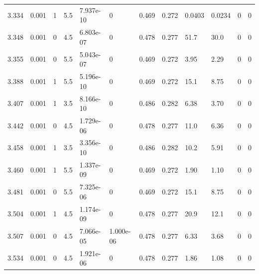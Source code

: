 \documentclass[preview]{standalone}
\begin{document}
{{{{{{\begin{tabular}{L{1.2cm}C{1.2cm} C{0.3cm}C{0.5cm} C{1.4cm}C{1.4cm} C{1.4cm}C{1.4cm} C{1.6cm}C{1.6cm} C{1.6cm}C{1.6cm}}
  3.334  &  0.001  & 1     & 5.5 &  7.937e-10  & 0  &  0.469&   0.272& 0.0403 & 0.0234   &  0 & 0  \\ 
  3.348  &  0.001  & 0     & 4.5 &  6.803e-07  & 0  &  0.478&   0.277& 51.7 & 30.0   &  0 & 0  \\ 
  3.355  &  0.001  & 0     & 5.5 &  5.043e-07  & 0  &  0.469&   0.272& 3.95 & 2.29   &  0 & 0  \\ 
  3.388  &  0.001  & 1     & 5.5 &  5.196e-10  & 0  &  0.469&   0.272& 15.1 & 8.75   &  0 & 0  \\ 
  3.407  &  0.001  & 1     & 3.5 &  8.166e-10  & 0  &  0.486&   0.282& 6.38 & 3.70   &  0 & 0  \\ 
  3.442  &  0.001  & 0     & 4.5 &  1.729e-06  & 0  &  0.478&   0.277& 11.0 & 6.36   &  0 & 0  \\ 
  3.458  &  0.001  & 1     & 3.5 &  3.356e-10  & 0  &  0.486&   0.282& 10.2 & 5.91   &  0 & 0  \\ 
  3.460  &  0.001  & 1     & 5.5 &  1.337e-09  & 0  &  0.469&   0.272& 1.90 & 1.10   &  0 & 0  \\ 
  3.481  &  0.001  & 0     & 5.5 &  7.325e-06  & 0  &  0.469&   0.272& 15.1 & 8.75   &  0 & 0  \\ 
  3.504  &  0.001  & 1     & 4.5 &  1.174e-09  & 0  &  0.478&   0.277& 20.9 & 12.1   &  0 & 0  \\ 
  3.507  &  0.001  & 0     & 4.5 &  7.066e-05  & 1.000e-06  &  0.478&   0.277& 6.33 & 3.68   &  0 & 0  \\ 
  3.534  &  0.001  & 0     & 4.5 &  1.921e-06  & 0  &  0.478&   0.277& 1.86 & 1.08   &  0 & 0  \\ 
\hline 
\end{tabular} 

}}}}}}
\end{document}
